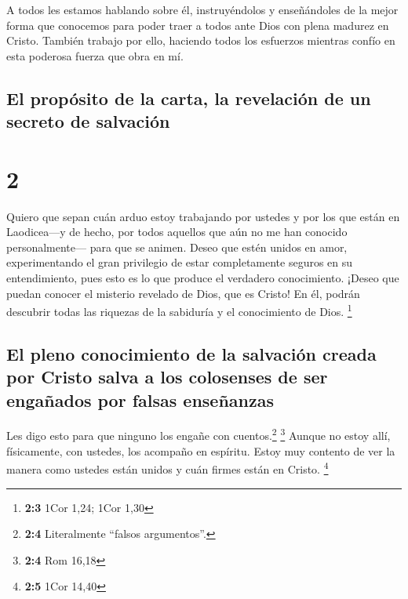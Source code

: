  A todos les estamos hablando sobre él, instruyéndolos y
enseñándoles de la mejor forma que conocemos para poder traer a todos
ante Dios con plena madurez en Cristo.  También trabajo
por ello, haciendo todos los esfuerzos mientras confío en esta poderosa
fuerza que obra en mí.

\hypertarget{el-propuxf3sito-de-la-carta-la-revelaciuxf3n-de-un-secreto-de-salvaciuxf3n}{%
\subsection{El propósito de la carta, la revelación de un secreto de
salvación}\label{el-propuxf3sito-de-la-carta-la-revelaciuxf3n-de-un-secreto-de-salvaciuxf3n}}

\hypertarget{section-1}{%
\section{2}\label{section-1}}

 Quiero que sepan cuán arduo estoy trabajando por ustedes
y por los que están en Laodicea---y de hecho, por todos aquellos que aún
no me han conocido personalmente---  para que se animen.
Deseo que estén unidos en amor, experimentando el gran privilegio de
estar completamente seguros en su entendimiento, pues esto es lo que
produce el verdadero conocimiento. ¡Deseo que puedan conocer el misterio
revelado de Dios, que es Cristo!  En él, podrán descubrir
todas las riquezas de la sabiduría y el conocimiento de Dios.
\footnote{\textbf{2:3} 1Cor 1,24; 1Cor 1,30}

\hypertarget{el-pleno-conocimiento-de-la-salvaciuxf3n-creada-por-cristo-salva-a-los-colosenses-de-ser-engauxf1ados-por-falsas-enseuxf1anzas}{%
\subsection{El pleno conocimiento de la salvación creada por Cristo
salva a los colosenses de ser engañados por falsas
enseñanzas}\label{el-pleno-conocimiento-de-la-salvaciuxf3n-creada-por-cristo-salva-a-los-colosenses-de-ser-engauxf1ados-por-falsas-enseuxf1anzas}}

 Les digo esto para que ninguno los engañe con
cuentos.\footnote{\textbf{2:4} Literalmente ``falsos argumentos''.}
\footnote{\textbf{2:4} Rom 16,18}  Aunque no estoy allí,
físicamente, con ustedes, los acompaño en espíritu. Estoy muy contento
de ver la manera como ustedes están unidos y cuán firmes están en
Cristo. \footnote{\textbf{2:5} 1Cor 14,40}


